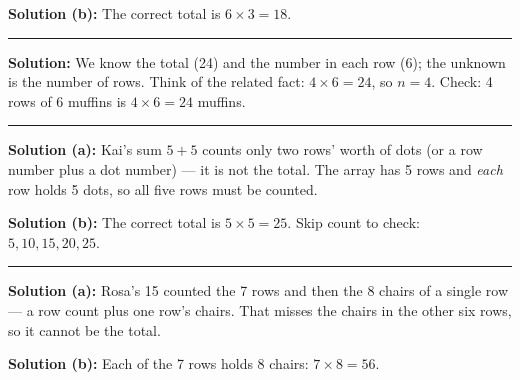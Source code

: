 \documentclass[12pt]{article}
\begin{document}
\textbf{Solution (b):} The correct total is $6 \times 3 = 18$. 

\vspace{0.2cm}\noindent\rule{\linewidth}{0.2pt}


\textbf{Solution:} We know the total (24) and the number in each row (6); the unknown is the number of rows. Think of the related fact: $4 \times 6 = 24$, so $n = 4$. Check: 4 rows of 6 muffins is $4 \times 6 = 24$ muffins. 

\vspace{0.2cm}\noindent\rule{\linewidth}{0.2pt}


\textbf{Solution (a):} Kai's sum $5 + 5$ counts only two rows' worth of dots (or a row number plus a dot number) --- it is not the total. The array has 5 rows and \emph{each} row holds 5 dots, so all five rows must be counted.

\textbf{Solution (b):} The correct total is $5 \times 5 = 25$. Skip count to check: $5, 10, 15, 20, 25$. 

\vspace{0.2cm}\noindent\rule{\linewidth}{0.2pt}


\textbf{Solution (a):} Rosa's 15 counted the 7 rows and then the 8 chairs of a single row --- a row count plus one row's chairs. That misses the chairs in the other six rows, so it cannot be the total.

\textbf{Solution (b):} Each of the 7 rows holds 8 chairs: $7 \times 8 = 56$. 
\end{document}

